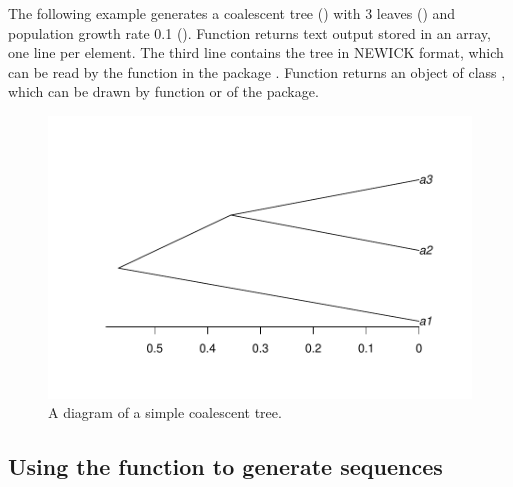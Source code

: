 The following example generates a coalescent tree ()
with 3 leaves ()
and population growth rate 0.1
(). Function  returns  text output
stored in an array, one line per element.
The third line contains the tree in NEWICK format, which can
be read by the  function in the  package
\citep{Paradis2004}.
Function  returns an object of class ,
which can be drawn by function  or 
of the  package.
\begin{figure}[h]
\begin{center}
\includegraphics[width=5.0in]{./phyclust-include/f-ms}
\caption{A diagram of a simple coalescent tree.}
\label{fig:ms}
\end{center}
\end{figure}




\subsection[Using the seqgen() function to generate sequences]{Using the  function to generate sequences}
\label{sec:seqgen}

